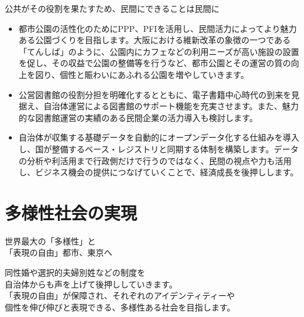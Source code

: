 \documentclass[dvipdfmx]{beamer}
\begin{document}
    \begin{frame}{公共がその役割を果たすため、民間にできることは民間に}{}
        \begin{small}
            \begin{itemize}
                \setlength{\itemsep}{2mm}
                \item 都市公園の活性化のためにPPP、PFIを活用し、民間活力によってより魅力ある公園づくりを目指します。大阪における維新改革の象徴の一つである「てんしば」のように、公園内にカフェなどの利用ニーズが高い施設の設置を促し、その収益で公園の整備等を行うなど、都市公園とその運営の質の向上を図り、個性と賑わいにあふれる公園を増やしていきます。
                \item 公営図書館の役割分担を明確化するとともに、電子書籍中心時代の到来を見据え、自治体運営による図書館のサポート機能を充実させます。また、魅力的な図書館運営の実績のある民間企業の活力導入も検討します。
                \item 自治体が収集する基礎データを自動的にオープンデータ化する仕組みを導入し、国が整備するベース・レジストリと同期する体制を構築します。データの分析や利活用まで行政側だけで行うのではなく、民間の視点や力も活用し、ビジネス機会の提供につなげていくことで、経済成長を後押しします。
            \end{itemize}
        \end{small}
    \end{frame}

\section{多様性社会の実現}
    \begin{frame}
        \sectionpage
        \begin{center}
            \begin{large}
                \alert{世界最大の「多様性」と}\\\alert{「表現の自由」都市、東京へ}
            \end{large}
        \end{center}
        \begin{small}
            同性婚や選択的夫婦別姓などの制度を\\
            自治体からも声を上げて後押ししていきます。\\
            「表現の自由」が保障され、それぞれのアイデンティティーや\\
            個性を伸び伸びと表現できる、多様性ある社会を目指します。
        \end{small}
    \end{frame}
\end{document}
